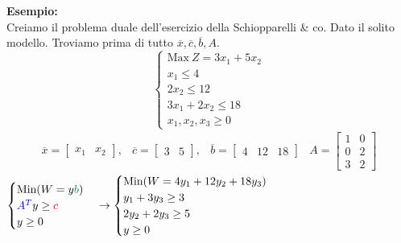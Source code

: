 \documentclass{article}
\begin{document}
\begin{tcolorbox}[breakable]
  \textbf{Esempio:}\\
  Creiamo il problema duale dell'esercizio della Schiopparelli \& co. Dato il solito modello. Troviamo prima di tutto $\overline{x}, \overline{c}, \overline{b}, A$.\\
  \begin{equation*}
    \begin{cases}
      \text{Max}\ Z = 3x_1 + 5x_2 \\
      x_1 \le 4                   \\
      2x_2 \le 12                 \\
      3x_1 + 2x_2 \le 18          \\
      x_1, x_2, x_3 \ge 0
    \end{cases}
  \end{equation*}
  \begin{equation*}
    \begin{array}{cccc}
      \overline{x} = \begin{bmatrix} x_1 & x_2 \end{bmatrix},  &
      \overline{c} = \begin{bmatrix} 3 & 5 \end{bmatrix},      &
      \overline{b} = \begin{bmatrix} 4 & 12 & 18 \end{bmatrix} &
      A = \begin{bmatrix} 1 & 0\\ 0 & 2 \\ 3 & 2\end{bmatrix}
    \end{array}
  \end{equation*}
  $
    \begin{cases}
      \text{Min}(W=y\textcolor{darkgreen}{b})         \\
      \textcolor{blue}{A^{T}}y \ge \textcolor{red}{c} \\
      y \ge 0
    \end{cases}
    \to
    \begin{cases}
      \text{Min}(W=4y_1+12y_2+18y_3) \\
      y_1+3y_3 \ge 3                 \\
      2y_2+2y_3 \ge 5                \\
      y \ge 0
    \end{cases}
  $

\end{tcolorbox}
\end{document}
